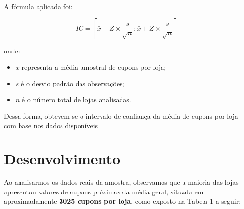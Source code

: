 \documentclass[12pt]{article}
\begin{document}
A fórmula aplicada foi:

\[
IC = [\bar{x} - Z \times \frac{s}{\sqrt{n}} ; \bar{x} + Z \times \frac{s}{\sqrt{n}}]
\]

onde:
\begin{itemize}
    \item $\bar{x}$ representa a média amostral de cupons por loja;
    \item $s$ é o desvio padrão das observações;
    \item $n$ é o número total de lojas analisadas.
\end{itemize}

Dessa forma, obtevem-se o intervalo de confiança da média de cupons por loja com base nos dados disponíveis

\section*{Desenvolvimento}

Ao analisarmos os dados reais da amostra, observamos que a maioria das lojas apresentou valores de cupons próximos da média geral, situada em aproximadamente \textbf{3025 cupons por loja}, como exposto na Tabela 1 a seguir:
\end{document}
